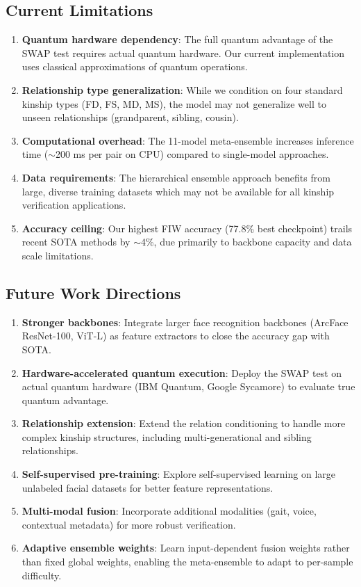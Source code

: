 \documentclass[journal,12pt]{IEEEtran}
\begin{document}
\subsection{Current Limitations}
\begin{enumerate}
    \item \textbf{Quantum hardware dependency}: The full quantum advantage
          of the SWAP test requires actual quantum hardware. Our current
          implementation uses classical approximations of quantum
          operations.
    \item \textbf{Relationship type generalization}: While we condition
          on four standard kinship types (FD, FS, MD, MS), the model may
          not generalize well to unseen relationships (grandparent,
          sibling, cousin).
    \item \textbf{Computational overhead}: The 11-model meta-ensemble
          increases inference time ($\sim$200 ms per pair on CPU) compared
          to single-model approaches.
    \item \textbf{Data requirements}: The hierarchical ensemble approach
          benefits from large, diverse training datasets which may not be
          available for all kinship verification applications.
    \item \textbf{Accuracy ceiling}: Our highest FIW accuracy (77.8\%
          best checkpoint) trails recent SOTA methods by $\sim$4\%, due
          primarily to backbone capacity and data scale limitations.
\end{enumerate}

\subsection{Future Work Directions}
\begin{enumerate}
    \item \textbf{Stronger backbones}: Integrate larger face recognition
          backbones (ArcFace ResNet-100, ViT-L) as feature extractors to
          close the accuracy gap with SOTA.
    \item \textbf{Hardware-accelerated quantum execution}: Deploy the SWAP
          test on actual quantum hardware (IBM Quantum, Google Sycamore) to
          evaluate true quantum advantage.
    \item \textbf{Relationship extension}: Extend the relation conditioning
          to handle more complex kinship structures, including
          multi-generational and sibling relationships.
    \item \textbf{Self-supervised pre-training}: Explore self-supervised
          learning on large unlabeled facial datasets for better feature
          representations.
    \item \textbf{Multi-modal fusion}: Incorporate additional modalities
          (gait, voice, contextual metadata) for more robust verification.
    \item \textbf{Adaptive ensemble weights}: Learn input-dependent fusion
          weights rather than fixed global weights, enabling the
          meta-ensemble to adapt to per-sample difficulty.
\end{enumerate}
\end{document}
